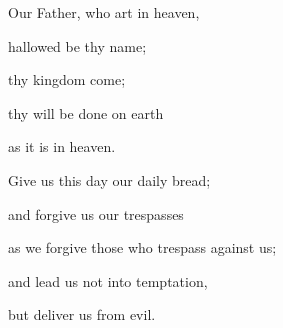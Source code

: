 Our Father, who art in heaven,

hallowed be thy name;

thy kingdom come;

thy will be done on earth

as it is in heaven.

Give us this day our daily bread;

and forgive us our trespasses

as we forgive those who trespass against us;

and lead us not into temptation,

but deliver us from evil.